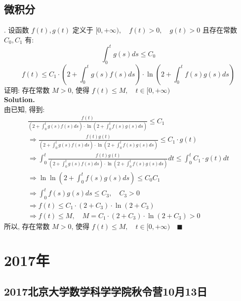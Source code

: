 \documentclass[UTF8]{article}
\begin{document}
\subsection{微积分}
. 设函数 $f(t), g(t) $ 定义于 $[0,+\infty), \quad f(t)>0, \quad g(t) >0$ 且存在常数 $C_0,C_1$ 有:  $$\int_{0}^{t}g(s)ds \leq C_0$$  $$f(t) \leq C_1 \cdot \left(2+\int_{0}^{t}g(s)f(s)ds\right) \cdot \ln(2+\int_{0}^{t}f(s)g(s)ds)$$ 
证明: 存在常数 $M>0$, 使得 $f(t) \leq M, \quad t\in [0,+\infty)$ \\
\noindent \textbf{Solution.} \\
由已知, 得到:
\begin{align*}
 \frac{f(t)}{(2+\int_{0}^{t}g(s)f(s)ds ) \cdot \ln(2+\int_{0}^{t}f(s)g(s)ds)} \leq C_1 \\
\Longrightarrow  \frac{f(t)g(t)}{(2+\int_{0}^{t}g(s)f(s)ds ) \cdot \ln(2+\int_{0}^{t}f(s)g(s)ds)} \leq C_1\cdot g(t) \\
\Longrightarrow \int_{0}^{t} \frac{f(t)g(t)}{(2+\int_{0}^{t}g(s)f(s)ds ) \cdot \ln(2+\int_{0}^{t}f(s)g(s)ds)} dt \leq \int_{0}^{t}C_1\cdot g(t) dt \\
\Longrightarrow \ln \ln (2+\int_{0}^{t}f(s)g(s)ds) \leq C_0C_1 \\
\Longrightarrow \int_{0}^{t}f(s)g(s)ds \leq C_3 , \quad C_3 > 0\\
\Longrightarrow f(t) \leq C_1\cdot (2+C_3) \cdot \ln(2+C_3) \\
\Longrightarrow f(t) \leq M, \quad M = C_1\cdot (2+C_3) \cdot \ln(2+C_3) > 0  
\end{align*}
所以, 存在常数 $M>0$, 使得 $f(t) \leq M, \quad t\in [0,+\infty) \quad \blacksquare$





\section{2017年}

\subsection{2017北京大学数学科学学院秋令营10月13日}
\end{document}
